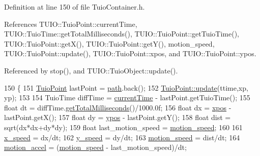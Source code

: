 Definition at line 150 of file Tuio\+Container.\+h.



References T\+U\+I\+O\+::\+Tuio\+Point\+::current\+Time, T\+U\+I\+O\+::\+Tuio\+Time\+::get\+Total\+Milliseconds(), T\+U\+I\+O\+::\+Tuio\+Point\+::get\+Tuio\+Time(), T\+U\+I\+O\+::\+Tuio\+Point\+::get\+X(), T\+U\+I\+O\+::\+Tuio\+Point\+::get\+Y(), motion\+\_\+speed, T\+U\+I\+O\+::\+Tuio\+Point\+::update(), T\+U\+I\+O\+::\+Tuio\+Point\+::xpos, and T\+U\+I\+O\+::\+Tuio\+Point\+::ypos.



Referenced by stop(), and T\+U\+I\+O\+::\+Tuio\+Object\+::update().


\begin{DoxyCode}
150                                                                  \{
151             \hyperlink{class_t_u_i_o_1_1_tuio_point_a8611528cf41b797c51d6a9bf324157a5}{TuioPoint} lastPoint = \hyperlink{class_t_u_i_o_1_1_tuio_container_a4bdb8935091e0736b6c19ce9fd676b9a}{path}.back();
152             \hyperlink{class_t_u_i_o_1_1_tuio_point_aa1cc8711747080dd00eb50577d73d038}{TuioPoint::update}(ttime,xp, yp);
153             
154             TuioTime diffTime = \hyperlink{class_t_u_i_o_1_1_tuio_point_ad04658d52ab78e3e0ddc21584ceaa2ff}{currentTime} - lastPoint.getTuioTime();
155             \textcolor{keywordtype}{float} dt = diffTime.\hyperlink{class_t_u_i_o_1_1_tuio_time_a7e861c278e95080b6f087c8c32ed2561}{getTotalMilliseconds}()/1000.0f;
156             \textcolor{keywordtype}{float} dx = \hyperlink{class_t_u_i_o_1_1_tuio_point_a0021f8dfddd05f2a17e713a94f5457e6}{xpos} - lastPoint.getX();
157             \textcolor{keywordtype}{float} dy = \hyperlink{class_t_u_i_o_1_1_tuio_point_a89a038775a681166168735dbc95c7779}{ypos} - lastPoint.getY();
158             \textcolor{keywordtype}{float} dist = sqrt(dx*dx+dy*dy);
159             \textcolor{keywordtype}{float} last\_motion\_speed = \hyperlink{class_t_u_i_o_1_1_tuio_container_a7810725234e427d4508f6b6a9874723b}{motion\_speed};
160             
161             \hyperlink{class_t_u_i_o_1_1_tuio_container_a5ee28d0495d5cc4fa331ed0b14b9e176}{x\_speed} = dx/dt;
162             \hyperlink{class_t_u_i_o_1_1_tuio_container_a2499ba8d5c0d8ca4afc3b55ddff4ff1a}{y\_speed} = dy/dt;
163             \hyperlink{class_t_u_i_o_1_1_tuio_container_a7810725234e427d4508f6b6a9874723b}{motion\_speed} = dist/dt;
164             \hyperlink{class_t_u_i_o_1_1_tuio_container_adaa20f12158aee41f7502da330f2a97e}{motion\_accel} = (\hyperlink{class_t_u_i_o_1_1_tuio_container_a7810725234e427d4508f6b6a9874723b}{motion\_speed} - last\_motion\_speed)/dt;

\end{DoxyCode}
